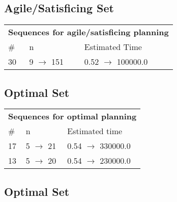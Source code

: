 \documentclass{article}
\begin{document}
                         \subsection*{Agile/Satisficing Set}

                        \begin{center}
                        \begin{tabular}{l|l|l}
                        \multicolumn{3}{c}{\bf \large Sequences for agile/satisficing planning}\\
                        \# & n & Estimated Time\\\midrule
                        30&9 $\rightarrow$ 151&0.52 $\rightarrow$ 100000.0
                        \end{tabular}
                        \end{center}
                    
                            \subsection*{Optimal Set}

                            \begin{center}
                            \begin{tabular}{l|l|l}
                            \multicolumn{3}{c}{\bf \large Sequences for optimal planning}\\
                            \# & n & Estimated time\\\midrule
                            17&5 $\rightarrow$ 21&0.54 $\rightarrow$ 330000.0\\
13&5 $\rightarrow$ 20&0.54 $\rightarrow$ 230000.0
                            \end{tabular}
                            \end{center}
                    
                                \subsection*{Optimal Set}
                                
\end{document}
